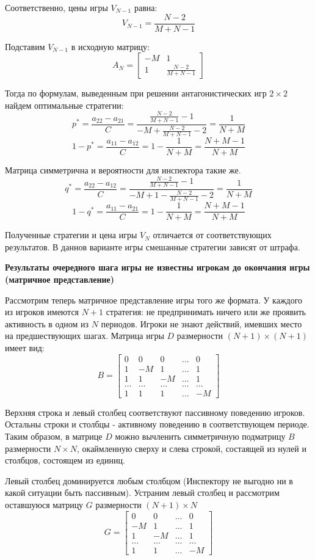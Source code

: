 \documentclass[aps,%
12pt,%
final,%
oneside,
onecolumn,%
musixtex, %
superscriptaddress,%
centertags]{article} %
\theoremstyle{plain}
\theoremstyle{definition}
\theoremstyle{remark}
\begin{document}
Соответственно, цены игры $V_{N-1}$ равна:
$$V_{N-1} = \frac{N-2}{M+N-1}$$

Подставим $V_{N-1}$ в исходную матрицу:
$$A_N = \begin{bmatrix}
  -M & 1 \\ 1 & \frac{N-2}{M+N-1}
\end{bmatrix}$$

Тогда по формулам, выведенным при решении антагонистических игр $2\times 2$ найдем оптимальные стратегии:
$$p^{*} = \frac {a_{22}-a_{21}}{C}  = \frac{\frac{N-2}{M+N-1}-1}{-M+\frac{N-2}{M+N-1}-2} = \frac{1}{N+M}$$
$$1-p^{*} = \frac{a_{11} - a_{12}}{C}  = 1 - \frac{1}{N+M} = \frac{N+M-1}{N+M}$$

Матрица симметрична и вероятности для инспектора такие же.
$$q^{*} = \frac {a_{22}-a_{12}}{C} = \frac{\frac{N-2}{M+N-1}-1}{-M+1 - \frac{N-2}{M+N-1}-2} = \frac{1}{N+M}$$
$$1-q^{*} = \frac{a_{11} - a_{21}}{C}  = 1 - \frac{1}{N+M} = \frac{N+M-1}{N+M}$$

Полученные стратегии и цена игры $V_N$ отличается от соответствующих результатов. В даннов варианте игры смешанные стратегии зависят от штрафа.

\textbf{Результаты очередного шага игры не известны игрокам до окончания игры (матричное представление)}

Рассмотрим теперь матричное представление игры того же формата. У каждого из игроков имеются $N+1$ стратегия: не предпринимать ничего или же проявить активность в одном из $N$ периодов. Игроки не знают действий, имевших место на предшествующих шагах. Матрица игры $D$ размерности $(N+1) \times (N+1)$ имеет вид:
$$B = \begin{bmatrix}
  0 & 0 & 0 & \ldots & 0 \\
  1 &-M & 1 & \ldots & 1 \\
  1 & 1 & -M & \ldots & 1 \\
  \ldots & \ldots & \ldots & \ldots & \ldots \\
  1 & 1 & 1 & \ldots & -M
\end{bmatrix}$$

Верхняя строка и левый столбец соответствуют пассивному поведению игроков. Остальны строки и столбцы - активному поведению в соответствующем периоде. Таким образом, в матрице $D$ можно вычленить симметричную подматрицу $B$ размерности $N \times N$, окаймленную сверху и слева строкой, состаящей из нулей и столбцов, состоящем из единиц.

Левый столбец доминируется любым столбцом (Инспектору не выгодно ни в какой ситуации быть пассивным). Устраним левый столбец и рассмотрим оставшуюся матрицу $G$ размерности $(N+1) \times N$
$$G = \begin{bmatrix}
  0 & 0 & \ldots & 0 \\
  -M & 1 & \ldots & 1 \\
  1 & -M & \ldots & 1 \\
  \ldots & \ldots & \ldots & \ldots \\
  1 & 1 & \ldots & -M
\end{bmatrix}$$
\end{document}
